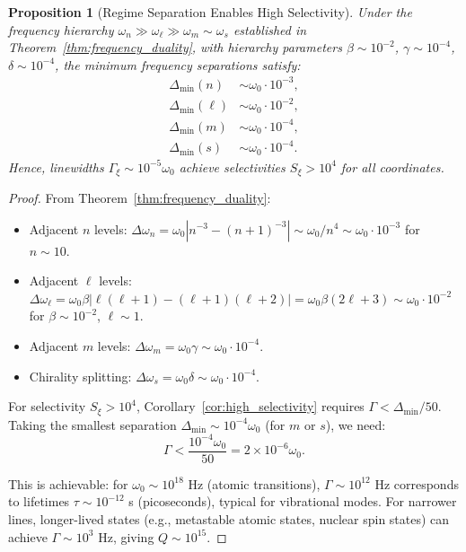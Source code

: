 \documentclass[twocolumn,10pt,a4paper]{article}
\newtheorem{proposition}[theorem]{Proposition}
\theoremstyle{remark}
\begin{document}
\begin{proposition}[Regime Separation Enables High Selectivity]
\label{prop:regime_selectivity}
Under the frequency hierarchy $\omega_n \gg \omega_\ell \gg \omega_m \sim \omega_s$ established in Theorem~\ref{thm:frequency_duality}, with hierarchy parameters $\beta \sim 10^{-2}$, $\gamma \sim 10^{-4}$, $\delta \sim 10^{-4}$, the minimum frequency separations satisfy:
\begin{align}
\Delta_{\min}(n) &\sim \omega_0 \cdot 10^{-3}, \\
\Delta_{\min}(\ell) &\sim \omega_0 \cdot 10^{-2}, \\
\Delta_{\min}(m) &\sim \omega_0 \cdot 10^{-4}, \\
\Delta_{\min}(s) &\sim \omega_0 \cdot 10^{-4}.
\end{align}
Hence, linewidths $\Gamma_\xi \sim 10^{-5} \omega_0$ achieve selectivities $S_\xi > 10^4$ for all coordinates.
\end{proposition}

\begin{proof}
From Theorem~\ref{thm:frequency_duality}:
\begin{itemize}[noitemsep]
    \item Adjacent $n$ levels: $\Delta\omega_n = \omega_0 |n^{-3} - (n+1)^{-3}| \sim \omega_0 / n^4 \sim \omega_0 \cdot 10^{-3}$ for $n \sim 10$.
    \item Adjacent $\ell$ levels: $\Delta\omega_\ell = \omega_0 \beta |\ell(\ell+1) - (\ell+1)(\ell+2)| = \omega_0 \beta (2\ell + 3) \sim \omega_0 \cdot 10^{-2}$ for $\beta \sim 10^{-2}$, $\ell \sim 1$.
    \item Adjacent $m$ levels: $\Delta\omega_m = \omega_0 \gamma \sim \omega_0 \cdot 10^{-4}$.
    \item Chirality splitting: $\Delta\omega_s = \omega_0 \delta \sim \omega_0 \cdot 10^{-4}$.
\end{itemize}

For selectivity $S_\xi > 10^4$, Corollary~\ref{cor:high_selectivity} requires $\Gamma < \Delta_{\min}/50$. Taking the smallest separation $\Delta_{\min} \sim 10^{-4} \omega_0$ (for $m$ or $s$), we need:
\begin{equation}
\Gamma < \frac{10^{-4} \omega_0}{50} = 2 \times 10^{-6} \omega_0.
\end{equation}

This is achievable: for $\omega_0 \sim 10^{18}$ Hz (atomic transitions), $\Gamma \sim 10^{12}$ Hz corresponds to lifetimes $\tau \sim 10^{-12}$ s (picoseconds), typical for vibrational modes. For narrower lines, longer-lived states (e.g., metastable atomic states, nuclear spin states) can achieve $\Gamma \sim 10^{3}$ Hz, giving $Q \sim 10^{15}$.
\end{proof}
\end{document}
